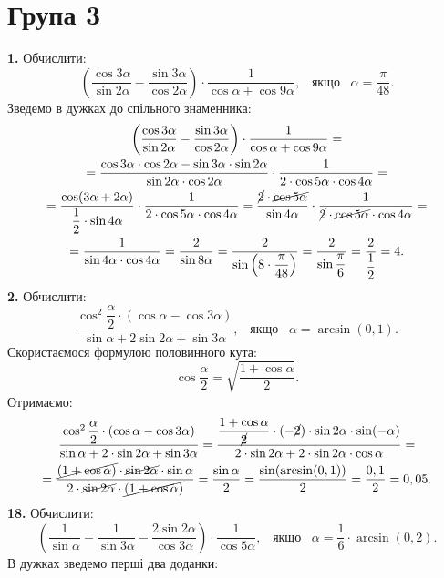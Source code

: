 \section*{Група 3}
\textbf{1.} Обчислити:
$$
\left(\dfrac{\cos3\alpha}{\sin2\alpha}-\dfrac{\sin3\alpha}{\cos2\alpha}\right)\cdot\dfrac{1}{\cos\alpha+\cos9\alpha}, \;\;\; \mbox{якщо} \;\;\; \alpha=\dfrac{\pi}{48}.
$$
Зведемо в дужках до спільного знаменника:
\begin{multline*}
\left(\dfrac{\cos3\alpha}{\sin2\alpha}-\dfrac{\sin3\alpha}{\cos2\alpha}\right)\cdot\dfrac{1}{\cos\alpha+\cos9\alpha}=\\
=\dfrac{\cos3\alpha\cdot\cos2\alpha-\sin3\alpha\cdot\sin2\alpha}{\sin2\alpha\cdot\cos2\alpha}\cdot\dfrac{1}{2\cdot\cos5\alpha\cdot\cos4\alpha}=\\
=\dfrac{\cos(3\alpha+2\alpha)}{\dfrac{1}{2}\cdot\sin4\alpha}\cdot\dfrac{1}{2\cdot\cos5\alpha\cdot\cos4\alpha}=
\dfrac{\cancel{2}\cdot\cancel{\cos5\alpha}}{\sin4\alpha}\cdot\dfrac{1}{\cancel{2}\cdot\cancel{\cos5\alpha}\cdot\cos4\alpha}=\\
=\dfrac{1}{\sin4\alpha\cdot\cos4\alpha}=
\dfrac{2}{\sin8\alpha}=
\dfrac{2}{\sin\left(8\cdot\dfrac{\pi}{48}\right)}=
\dfrac{2}{\sin\dfrac{\pi}{6}}=\dfrac{2}{\dfrac{1}{2}}=4.
\end{multline*}
\textbf{2.} Обчислити:
$$
\dfrac{\cos^2\dfrac{\alpha}{2}\cdot(\cos\alpha-\cos3\alpha)}{\sin\alpha+2\sin2\alpha+\sin3\alpha}, \;\;\; \mbox{якщо} \;\;\; \alpha=\arcsin(0,1).
$$
Скористаємося формулою половинного кута:
$$
\cos\dfrac{\alpha}{2}=\sqrt{\dfrac{1+\cos\alpha}{2}}.
$$
Отримаємо:
\begin{multline*}
\dfrac{\cos^2\dfrac{\alpha}{2}\cdot(\cos\alpha-\cos3\alpha)}{\sin\alpha+2\cdot\sin2\alpha+\sin3\alpha}=
\dfrac{\dfrac{1+\cos\alpha}{\cancel{2}}\cdot(-\cancel{2})\cdot\sin2\alpha\cdot\sin(-\alpha)}{2\cdot\sin2\alpha+2\cdot\sin2\alpha\cdot\cos\alpha}=\\
=\dfrac{\cancel{(1+\cos\alpha)}\cdot\cancel{\sin2\alpha}\cdot\sin\alpha}{2\cdot\cancel{\sin2\alpha}\cdot\cancel{(1+\cos\alpha)}}=
\dfrac{\sin\alpha}{2}=\dfrac{\sin(\arcsin(0,1))}{2}=\dfrac{0,1}{2}=0,05.
\end{multline*}
\textbf{18.} Обчислити:
$$
\left(\dfrac{1}{\sin\alpha}-\dfrac{1}{\sin3\alpha}-\dfrac{2\sin2\alpha}{\cos3\alpha}\right)\cdot\dfrac{1}{\cos5\alpha}, \;\;\; \mbox{якщо} \;\;\; \alpha=\dfrac{1}{6}\cdot\arcsin(0,2).
$$
В дужках зведемо перші два доданки:
